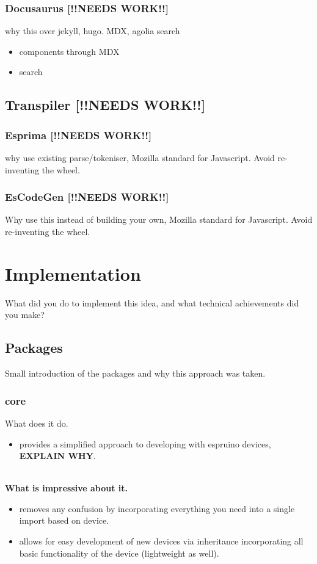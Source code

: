 \documentclass{l4proj}
\begin{document}
\subsection{Docusaurus [!!NEEDS WORK!!]}
\text why this over jekyll, hugo. MDX, agolia search
\begin{itemize}
    \item components through MDX
    \item search
\end{itemize}

\section{Transpiler [!!NEEDS WORK!!]}

\subsection{Esprima [!!NEEDS WORK!!]}
\text why use existing parse/tokeniser, Mozilla standard for Javascript. Avoid re-inventing the wheel.
\subsection{EsCodeGen [!!NEEDS WORK!!]}
\text Why use this instead of building your own, Mozilla standard for Javascript. Avoid re-inventing the wheel.
\chapter{Implementation}
What did you do to implement this idea, and what technical achievements did you make?
\section{Packages}
Small introduction of the packages and why this approach was taken.
\subsection{core}

\text What does it do.
\begin{itemize}
    \item provides a simplified approach to developing with espruino devices, \textbf{EXPLAIN WHY}.
\end{itemize}
\\
\textbf{What is impressive about it.}
\begin{itemize}
    \item removes any confusion by incorporating everything you need into a single import based on device.
    \item allows for easy development of new devices via inheritance incorporating all basic functionality of the device (lightweight as well).
\end{itemize}
\end{document}
